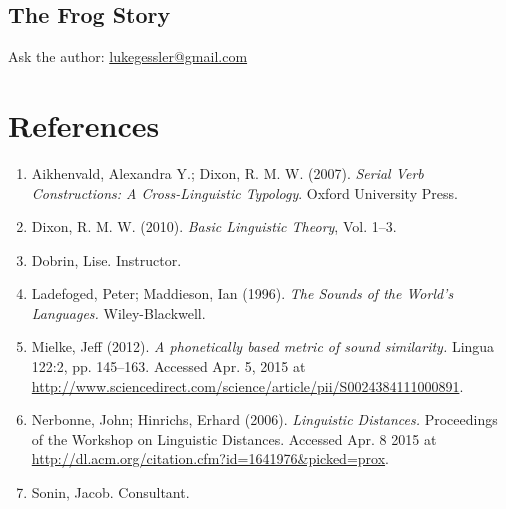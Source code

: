 \documentclass[pdftex,12pt,letterpaper]{article}
\begin{document}
 \subsection{The Frog Story}
 
 Ask the author: \url{lukegessler@gmail.com}

 \pagebreak
 \section*{References}

 \begin{enumerate}


 \item Aikhenvald, Alexandra Y.; Dixon, R. M. W. (2007). \emph{Serial Verb Constructions: A Cross-Linguistic Typology}. Oxford University Press.

 \item Dixon, R. M. W. (2010). \emph{Basic Linguistic Theory}, Vol. 1--3.

 \item Dobrin, Lise. Instructor.

 \item Ladefoged, Peter; Maddieson, Ian (1996). \emph{The Sounds of the World's Languages.} Wiley-Blackwell.
 
 \item Mielke, Jeff (2012). \emph{A phonetically based metric of sound similarity.} Lingua 122:2, pp. 145--163. Accessed Apr. 5, 2015 at \url{http://www.sciencedirect.com/science/article/pii/S0024384111000891}.
 
 \item Nerbonne, John; Hinrichs, Erhard (2006). \emph{Linguistic Distances.} Proceedings of the Workshop on Linguistic Distances. Accessed Apr. 8 2015 at \url{http://dl.acm.org/citation.cfm?id=1641976&picked=prox}.

 \item Sonin, Jacob. Consultant.
 


 \end{enumerate}




 
\end{document}
